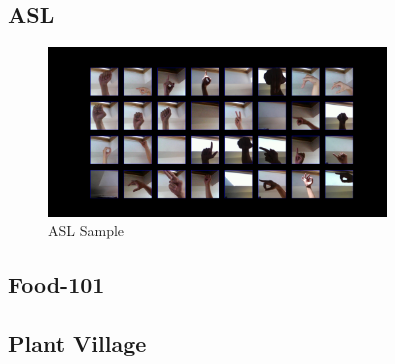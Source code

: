 \subsection{ASL}

\begin{figure}[h]
	\centering
	\includegraphics[width=0.8\textwidth]{images/asl.png}
	\caption{ASL Sample}
	\label{fig:asl}

\end{figure}

\subsection{Food-101}

\subsection*{Plant Village}